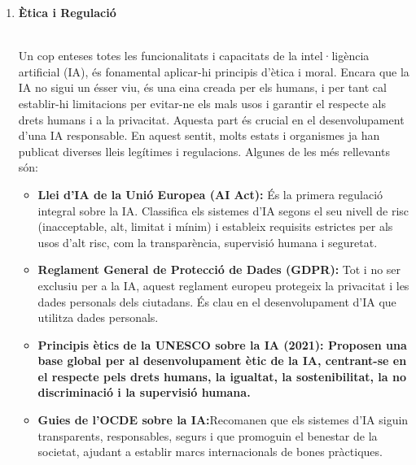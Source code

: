 \begin{enumerate}
\begin{enumerate}
 \end{enumerate}
 \item \hypertarget{Ètica i Regulació}{\textbf{Ètica i Regulació}}\\
 Un cop enteses totes les funcionalitats i capacitats de la intel·ligència artificial (IA), és fonamental aplicar-hi principis d’ètica i moral. Encara que la IA no sigui un ésser viu, és una eina creada per els  humans, i per tant cal establir-hi limitacions per evitar-ne els mals usos i garantir el respecte als drets humans i a la privacitat. Aquesta part és crucial en el desenvolupament d’una IA responsable. En aquest sentit, molts estats i organismes ja han publicat diverses lleis legítimes i regulacions. Algunes de les més rellevants són:
     \begin{itemize}
        \item \textbf{Llei d’IA de la Unió Europea (AI Act):} És la primera regulació integral sobre la IA. Classifica els sistemes d’IA segons el seu nivell de risc (inacceptable, alt, limitat i mínim) i estableix requisits estrictes per als usos d’alt risc, com la transparència, supervisió humana i seguretat.
           \item \textbf{Reglament General de Protecció de Dades (GDPR):} Tot i no ser exclusiu per a la IA, aquest reglament europeu protegeix la privacitat i les dades personals dels ciutadans. És clau en el desenvolupament d’IA que utilitza dades personals.
          \item \textbf{Principis ètics de la UNESCO sobre la IA (2021): Proposen una base global per al desenvolupament ètic de la IA, centrant-se en el respecte pels drets humans, la igualtat, la sostenibilitat, la no discriminació i la supervisió humana.}
          \item \textbf{Guies de l’OCDE sobre la IA:}Recomanen que els sistemes d’IA siguin transparents, responsables, segurs i que promoguin el benestar de la societat, ajudant a establir marcs internacionals de bones pràctiques.
     \end{itemize}


\end{enumerate}

